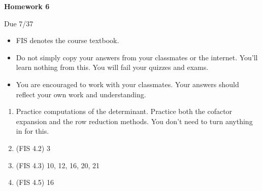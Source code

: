 \documentclass{article}
\begin{document}
\begin{center}
    {\bf Homework 6}
    
    Due 7/37
\end{center}

\begin{itemize}
    \item 
        FIS denotes the course textbook.
    \item
        Do not simply copy your answers from your classmates or the internet.
        You'll learn nothing from this. You will fail your quizzes and exams.
    \item
        You are encouraged to work with your classmates. Your answers
        should reflect your own work and understanding.
\end{itemize}

\begin{enumerate}
    \item
        Practice computations of the determinant. Practice both the cofactor
        expansion and the row reduction methods. You don't need to turn
        anything in for this.
	\item
        (FIS 4.2) 3
    \item
        (FIS 4.3) 10, 12, 16, 20, 21
    \item
        (FIS 4.5) 16
\end{enumerate}
    
\end{document}

